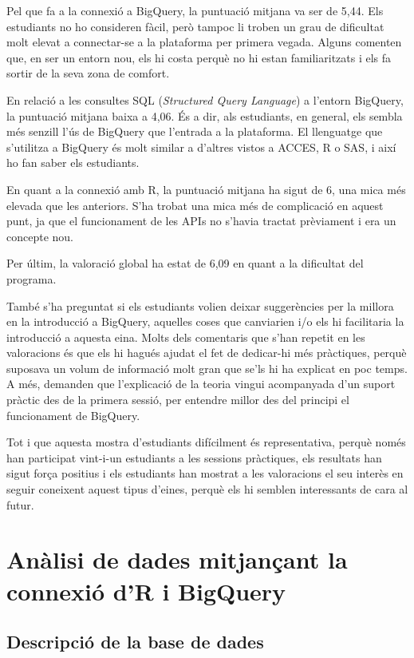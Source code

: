 \documentclass[12pt,longbibliography]{article}
\theoremstyle{definition}
\theoremstyle{remark}
\begin{document}
Pel que fa a la connexió a BigQuery, la puntuació mitjana va ser de 5,44. Els estudiants no ho consideren fàcil, però tampoc li troben un grau de dificultat molt elevat a connectar-se a la plataforma per primera vegada. Alguns comenten que, en ser un entorn nou, els hi costa perquè no hi estan familiaritzats i els fa sortir de la seva zona de comfort.


En relació a les consultes SQL (\textit{Structured Query Language}) a l'entorn BigQuery, la puntuació mitjana baixa a 4,06. És a dir, als estudiants, en general, els sembla més senzill l'ús de BigQuery que l'entrada a la plataforma. El llenguatge que s'utilitza a BigQuery és molt similar a d'altres vistos a ACCES, R o SAS, i així ho fan saber els estudiants.


En quant a la connexió amb R, la puntuació mitjana ha sigut de 6, una mica més elevada que les anteriors. S'ha trobat una mica més de complicació en aquest punt, ja que el funcionament de les APIs no s'havia tractat prèviament i era un concepte nou.


Per últim, la valoració global ha estat de 6,09 en quant a la dificultat del programa.


També s'ha preguntat si els estudiants volien deixar suggerències per la millora en la introducció a BigQuery, aquelles coses que canviarien i/o els hi facilitaria la introducció a aquesta eina. Molts dels comentaris que s'han repetit en les valoracions és que els hi hagués ajudat el fet de dedicar-hi més pràctiques, perquè suposava un volum de informació molt gran que se'ls hi ha explicat en poc temps. A més, demanden que l'explicació de la teoria vingui acompanyada d'un suport pràctic des de la primera sessió, per entendre millor des del principi el funcionament de BigQuery.


Tot i que aquesta mostra d'estudiants difícilment és representativa, perquè només han participat vint-i-un estudiants a les sessions pràctiques, els resultats han sigut força positius i els estudiants han mostrat a les valoracions el seu interès en seguir coneixent aquest tipus d'eines, perquè els hi semblen interessants de cara al futur.


\newpage

\section{Anàlisi de dades mitjançant la connexió d'R i BigQuery}

\subsection{Descripció de la base de dades}
\end{document}
